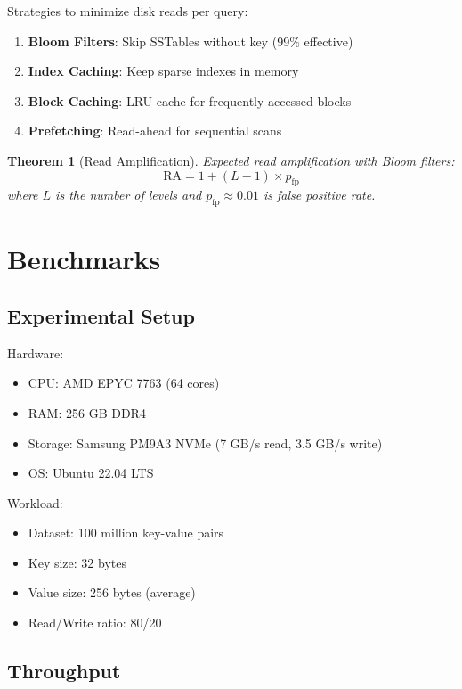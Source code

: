 \documentclass[11pt,a4paper]{article}
\newtheorem{theorem}{Theorem}
\begin{document}
Strategies to minimize disk reads per query:

\begin{enumerate}
    \item \textbf{Bloom Filters}: Skip SSTables without key (99\% effective)
    \item \textbf{Index Caching}: Keep sparse indexes in memory
    \item \textbf{Block Caching}: LRU cache for frequently accessed blocks
    \item \textbf{Prefetching}: Read-ahead for sequential scans
\end{enumerate}

\begin{theorem}[Read Amplification]
Expected read amplification with Bloom filters:
\[
\text{RA} = 1 + (L-1) \times p_{\text{fp}}
\]
where $L$ is the number of levels and $p_{\text{fp}} \approx 0.01$ is false positive rate.
\end{theorem}

\section{Benchmarks}

\subsection{Experimental Setup}

Hardware:
\begin{itemize}
    \item CPU: AMD EPYC 7763 (64 cores)
    \item RAM: 256 GB DDR4
    \item Storage: Samsung PM9A3 NVMe (7 GB/s read, 3.5 GB/s write)
    \item OS: Ubuntu 22.04 LTS
\end{itemize}

Workload:
\begin{itemize}
    \item Dataset: 100 million key-value pairs
    \item Key size: 32 bytes
    \item Value size: 256 bytes (average)
    \item Read/Write ratio: 80/20
\end{itemize}

\subsection{Throughput}
\end{document}
